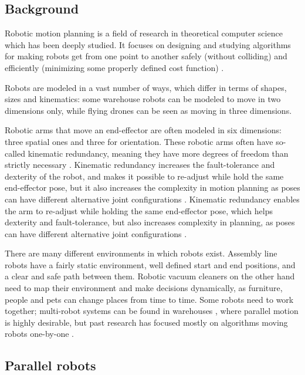 \subsection{Background}

Robotic motion planning is a field of research in theoretical computer science which has been deeply studied. 
It focuses on designing and studying algorithms for making robots get from one point to another safely (without colliding) and efficiently (minimizing some properly defined cost function) \cite{chosetPrinciplesRobotMotion2005}.

Robots are modeled in a vast number of ways, which differ in terms of shapes, sizes and kinematics: 
some warehouse robots can be modeled to move in two dimensions only, while flying drones can be seen as moving in three dimensions.

Robotic arms that move an end-effector are often modeled in six dimensions: three spatial ones and three for orientation. 
These robotic arms often have so-called kinematic redundancy, meaning they have more degrees of freedom than strictly necessary \cite{robo/ChiaveriniOM16}.
Kinematic redundancy increases the fault-tolerance and dexterity of the robot, and makes it possible to re-adjust while hold the same end-effector pose, but it also increases the complexity in motion planning as poses can have different alternative joint configurations \cite{robo/ChiaveriniOM16}. 
Kinematic redundancy enables the arm to re-adjust while holding the same end-effector pose, which helps dexterity and fault-tolerance, but also increases complexity in planning, as poses can have different alternative joint configurations \cite{robo/ChiaveriniOM16}.

There are many different environments in which robots exist. 
Assembly line robots have a fairly static environment, well defined start and end positions, and a clear and safe path between them.
Robotic vacuum cleaners on the other hand need to map their environment and make decisions dynamically, as furniture, people and pets can change places from time to time. 
Some robots need to work together; multi-robot systems can be found in warehouses \cite{robo/ParkerRS16}, where parallel motion is highly desirable, but past research has focused mostly on algorithms moving robots one-by-one \cite{siamcomp/DemaineFKMS19}.

\subsection{Parallel robots}

